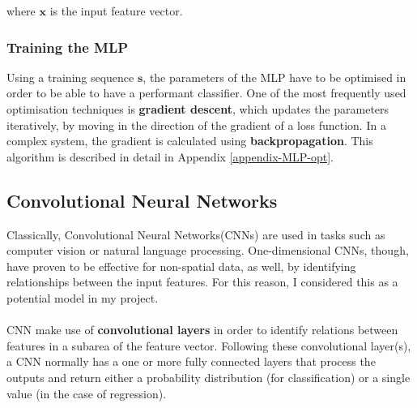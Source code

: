 	where $\mathbf{x}$ is the input feature vector.
	
	\subsubsection*{Training the MLP}
	Using a training sequence $\mathbf{s}$, the parameters of the MLP have to be optimised in order to be able to have a performant classifier. One of the most frequently used optimisation techniques is \textbf{gradient descent}, which updates the parameters iteratively, by moving in the direction of the gradient of a loss function. In a complex system, the gradient is calculated using \textbf{backpropagation}. This algorithm is described in detail in Appendix \ref{appendix-MLP-opt}. 
	
	\subsection{Convolutional Neural Networks} 
	Classically, Convolutional Neural Networks(CNNs) are used in tasks such as computer vision or natural language processing. One-dimensional CNNs, though, have proven to be effective for non-spatial data, as well, by identifying relationships between the input features. For this reason, I considered this as a potential model in my project. 
	\\ \\
	CNN make use of \textbf{convolutional layers} in order to identify relations between features in a subarea of the feature vector. 	Following these convolutional layer(s), a CNN normally has a one or more fully connected layers that process the outputs and return either a probability distribution (for classification) or a single value (in the case of regression).  
	

